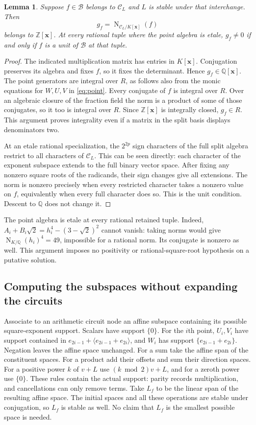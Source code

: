 \documentclass[11pt,a4paper]{article}
\newtheorem{lemma}[theorem]{Lemma}
\theoremstyle{remark}\newtheorem{remark}[theorem]{Remark}
\newcommand{\Q}{\mathbb Q}\newcommand{\Z}{\mathbb Z}\newcommand{\F}{\mathbb F}\newcommand{\C}{\mathbb C}
\DeclareMathOperator{\N}{N}\DeclareMathOperator{\Tr}{Tr}\DeclareMathOperator{\Span}{Span}
\begin{document}
\begin{lemma}\label{lem:smallnorm}
Suppose $f\in\mathcal B$ belongs to $\mathcal C_L$ and $L$ is stable
under that interchange. Then
\[
                         g_f=\N_{\mathcal C_L/K[\boldsymbol x]}(f)
\]
belongs to $\Z[\boldsymbol x]$. At every rational tuple where the
point algebra is etale, $g_f\ne0$ if and only if $f$ is a unit of
$\mathcal B$ at that tuple.
\end{lemma}
\begin{proof}
The indicated multiplication matrix has entries in $K[\boldsymbol x]$.
Conjugation preserves its algebra and fixes $f$, so it fixes the
determinant. Hence $g_f\in\Q[\boldsymbol x]$.
The point generators are integral over $R$, as follows also from the
monic equations for $W,U,V$ in \eqref{eq:point}. Every conjugate of
$f$ is integral over $R$. Over an algebraic closure of the fraction
field the norm is a product of some of those conjugates, so it too
is integral over $R$. Since $\Z[\boldsymbol x]$ is integrally closed,
$g_f\in R$. This argument proves integrality even if a matrix in the
split basis displays denominators two.

At an etale rational specialization, the $2^{2p}$ sign characters of
the full split algebra restrict to all characters of $\mathcal C_L$.
This can be seen directly: each character of the exponent subspace
extends to the full binary vector space. After fixing any nonzero
square roots of the radicands, their sign changes give all extensions.
The norm is nonzero precisely when every restricted character takes a
nonzero value on $f$, equivalently when every full character does so.
This is the unit condition. Descent to $\Q$ does not change it.
\end{proof}

The point algebra is etale at every rational retained tuple. Indeed,
$A_i+B_i\sqrt2=h_i^4-(3-\sqrt2)^2$ cannot vanish: taking norms
would give $\N_{K/\Q}(h_i)^4=49$, impossible for a rational norm.
Its conjugate is nonzero as well. This argument imposes no positivity
or rational-square-root hypothesis on a putative solution.

\subsection{Computing the subspaces without expanding the circuits}
Associate to an arithmetic circuit node an affine subspace containing
its possible square-exponent support. Scalars have support $\{0\}$.
For the $i$th point, $U_i,V_i$ have support contained in
$e_{2i-1}+\langle e_{2i-1}+e_{2i}\rangle$, and $W_i$ has support
$\{e_{2i-1}+e_{2i}\}$. Negation leaves the affine space unchanged.
For a sum take the affine span of the constituent spaces. For a product
add their offsets and sum their direction spaces. For a positive power
$k$ of $v+L$ use $(k\bmod2)v+L$, and for a zeroth power use $\{0\}$.
These rules contain the actual support: parity records multiplication,
and cancellations can only remove terms. Take $L_f$ to be the linear
span of the resulting affine space. The initial spaces and all these
operations are stable under conjugation, so $L_f$ is stable as well.
No claim that $L_f$ is the smallest possible space is needed.
\end{document}
